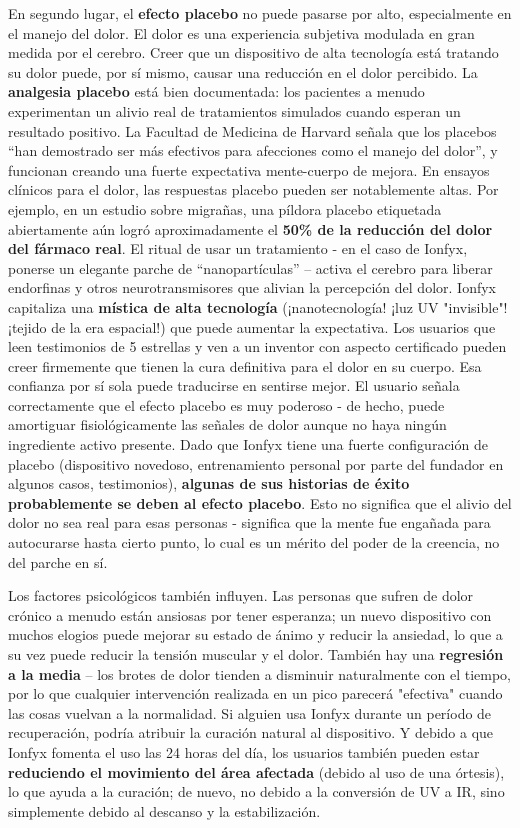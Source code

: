 \documentclass{article}
\begin{document}
En segundo lugar, el \textbf{efecto placebo} no puede pasarse por alto, especialmente en el manejo del dolor. El dolor es una experiencia subjetiva modulada en gran medida por el cerebro. Creer que un dispositivo de alta tecnología está tratando su dolor puede, por sí mismo, causar una reducción en el dolor percibido. La \textbf{analgesia placebo} está bien documentada: los pacientes a menudo experimentan un alivio real de tratamientos simulados cuando esperan un resultado positivo. La Facultad de Medicina de Harvard señala que los placebos “han demostrado ser más efectivos para afecciones como el manejo del dolor”, y funcionan creando una fuerte expectativa mente-cuerpo de mejora. En ensayos clínicos para el dolor, las respuestas placebo pueden ser notablemente altas. Por ejemplo, en un estudio sobre migrañas, una píldora placebo etiquetada abiertamente aún logró aproximadamente el \textbf{50\% de la reducción del dolor del fármaco real}. El ritual de usar un tratamiento - en el caso de Ionfyx, ponerse un elegante parche de “nanopartículas” – activa el cerebro para liberar endorfinas y otros neurotransmisores que alivian la percepción del dolor. Ionfyx capitaliza una \textbf{mística de alta tecnología} (¡nanotecnología! ¡luz UV "invisible"! ¡tejido de la era espacial!) que puede aumentar la expectativa. Los usuarios que leen testimonios de 5 estrellas y ven a un inventor con aspecto certificado pueden creer firmemente que tienen la cura definitiva para el dolor en su cuerpo. Esa confianza por sí sola puede traducirse en sentirse mejor. El usuario señala correctamente que el efecto placebo es muy poderoso - de hecho, puede amortiguar fisiológicamente las señales de dolor aunque no haya ningún ingrediente activo presente. Dado que Ionfyx tiene una fuerte configuración de placebo (dispositivo novedoso, entrenamiento personal por parte del fundador en algunos casos, testimonios), \textbf{algunas de sus historias de éxito probablemente se deben al efecto placebo}. Esto no significa que el alivio del dolor no sea real para esas personas - significa que la mente fue engañada para autocurarse hasta cierto punto, lo cual es un mérito del poder de la creencia, no del parche en sí.

Los factores psicológicos también influyen. Las personas que sufren de dolor crónico a menudo están ansiosas por tener esperanza; un nuevo dispositivo con muchos elogios puede mejorar su estado de ánimo y reducir la ansiedad, lo que a su vez puede reducir la tensión muscular y el dolor. También hay una \textbf{regresión a la media} – los brotes de dolor tienden a disminuir naturalmente con el tiempo, por lo que cualquier intervención realizada en un pico parecerá "efectiva" cuando las cosas vuelvan a la normalidad. Si alguien usa Ionfyx durante un período de recuperación, podría atribuir la curación natural al dispositivo. Y debido a que Ionfyx fomenta el uso las 24 horas del día, los usuarios también pueden estar \textbf{reduciendo el movimiento del área afectada} (debido al uso de una órtesis), lo que ayuda a la curación; de nuevo, no debido a la conversión de UV a IR, sino simplemente debido al descanso y la estabilización.
\end{document}
